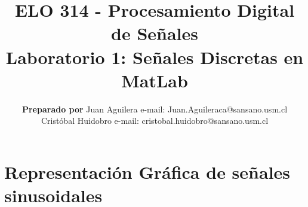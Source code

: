 \documentclass[letterpaper,onecolumn,10pt,journal,final]{IEEEtran}
\begin{document}
\title{ELO 314 - Procesamiento Digital de Señales\\ Laboratorio 1: Señales Discretas en MatLab}

\author{\textbf{Preparado por}
\vspace{1 mm}Juan Aguilera e-mail: Juan.Aguileraca@sansano.usm.cl \\
            Cristóbal Huidobro e-mail: 
cristobal.huidobro@sansano.usm.cl}

\maketitle

\vspace{-1 cm}

%
%
\section{Representación Gráfica de señales sinusoidales}
\end{document}
